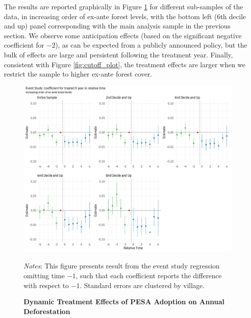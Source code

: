 \documentclass[12pt,reqno]{article}
\begin{document}
 The results are reported graphically in Figure \ref{fig:autor_plot} for different sub-samples of the data, in increasing order of ex-ante forest levels, with the bottom left (6th decile and up) panel corresponding with the main analysis sample in the previous section.  We observe some anticipation effects (based on the significant negative coefficient for $-2$), as can be expected from a publicly announced policy, but the bulk of effects are large and persistent following the treatment year. Finally, consistent with Figure \ref{fig:cutoff_plot}, the treatment effects are larger when we restrict the sample to higher ex-ante forest cover.

\begin{figure}[htbp!]
\begin{center}
\begin{minipage}{1 \linewidth}
\caption{\textbf{Dynamic Treatment Effects of PESA Adoption on Annual Deforestation} \label{fig:autor_plot}} 	
\centerline{\includegraphics[width=7.5 in,angle=0]{Output/Dyn_treat_eff_big.pdf}}
\smallskip
\normalsize
\emph{Notes}: This figure presents result from the event study regression omitting time $-1$, such that each coefficient reports the difference with respect to $-1$. Standard errors are clustered by village.
\end{minipage}
\end{center}
\end{figure}
\end{document}
